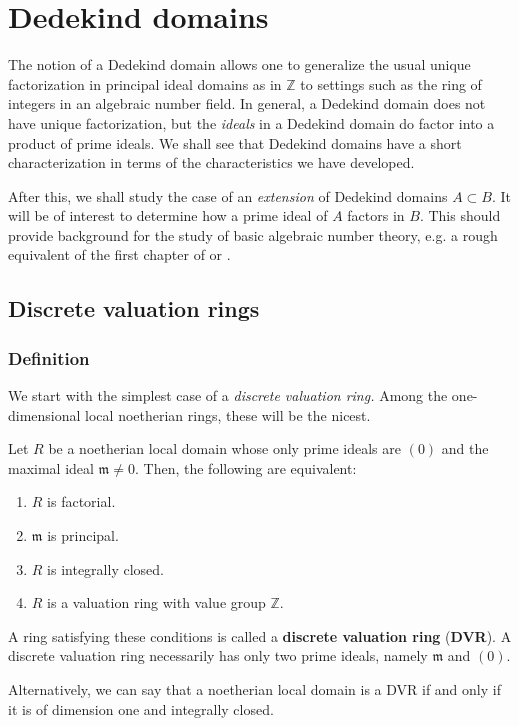 \chapter{Dedekind domains}

The notion of a Dedekind domain allows one to generalize the usual unique
factorization in principal ideal domains as in $\mathbb{Z}$ to settings such
as the ring of integers in an algebraic number field. In general, a Dedekind
domain does not have unique factorization, but the \emph{ideals} in a Dedekind
domain do factor into a product of prime ideals. 
We shall see that Dedekind domains have a short characterization in terms of
the characteristics we have developed.

After this, we shall study the case of an \emph{extension} of Dedekind domains $A \subset B$. It will be of
interest to determine how a prime ideal of $A$ factors in $B$. This should
provide background for the study of basic algebraic number theory, e.g. a
rough equivalent of the first chapter of 
\cite{La94} or \cite{Se79}.




\section{Discrete valuation rings}


\subsection{Definition}

We start with the simplest case of a \emph{discrete valuation ring.}
Among the one-dimensional local noetherian rings, these will be the nicest.

\begin{theorem} \label{DVRthm}
Let $R$ be a noetherian local domain whose only prime ideals are $(0)$ and the maximal
ideal 
$\mathfrak{m} \neq 0$. 
Then, the following are equivalent:
\begin{enumerate}
\item $R$ is factorial.
\item $\mathfrak{m}$ is principal.
\item  $R$ is integrally closed.
\item $R$ is a valuation ring with value group $\mathbb{Z}$. 
\end{enumerate}
\end{theorem} 
\begin{definition} 
A ring satisfying these conditions is called a \textbf{discrete valuation
ring} (\textbf{DVR}).
A discrete valuation ring necessarily has only two prime ideals, namely
$\mathfrak{m}$ and $(0)$. 

Alternatively, we can say that a noetherian local domain is a DVR if and only
if it is of dimension one and integrally closed.
\end{definition} 



